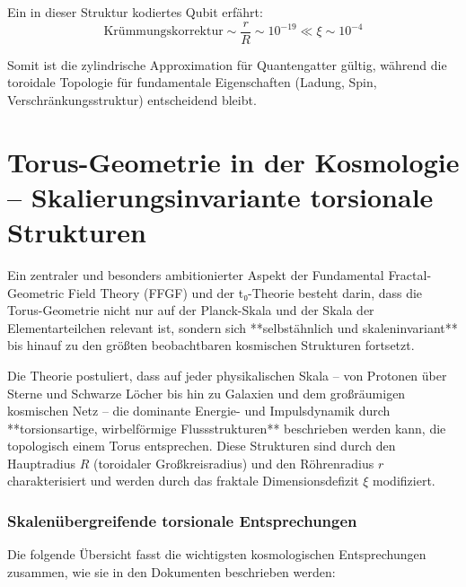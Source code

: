 	Ein in dieser Struktur kodiertes Qubit erfährt:
	\[
	\text{Krümmungskorrektur} \sim \frac{r}{R} \sim 10^{-19} 
	\ll \xi \sim 10^{-4}
	\]
	
	Somit ist die zylindrische Approximation für Quantengatter gültig, während die toroidale Topologie für fundamentale Eigenschaften (Ladung, Spin, Verschränkungsstruktur) entscheidend bleibt.
	\section{Torus-Geometrie in der Kosmologie – Skalierungsinvariante torsionale Strukturen}
	
	Ein zentraler und besonders ambitionierter Aspekt der Fundamental Fractal-Geometric Field Theory (FFGF) und der t₀-Theorie besteht darin, dass die Torus-Geometrie nicht nur auf der Planck-Skala und der Skala der Elementarteilchen relevant ist, sondern sich **selbstähnlich und skaleninvariant** bis hinauf zu den größten beobachtbaren kosmischen Strukturen fortsetzt.
	
	Die Theorie postuliert, dass auf jeder physikalischen Skala – von Protonen über Sterne und Schwarze Löcher bis hin zu Galaxien und dem großräumigen kosmischen Netz – die dominante Energie- und Impulsdynamik durch **torsionsartige, wirbelförmige Flussstrukturen** beschrieben werden kann, die topologisch einem Torus entsprechen. Diese Strukturen sind durch den Hauptradius $R$ (toroidaler Großkreisradius) und den Röhrenradius $r$ charakterisiert und werden durch das fraktale Dimensionsdefizit $\xi$ modifiziert.
	
	\subsubsection{Skalenübergreifende torsionale Entsprechungen}
	
	Die folgende Übersicht fasst die wichtigsten kosmologischen Entsprechungen zusammen, wie sie in den Dokumenten beschrieben werden:
	
